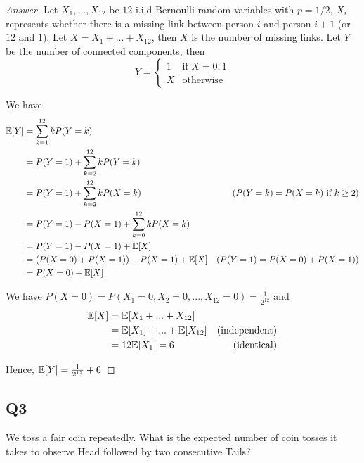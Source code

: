 \documentclass{article}
\begin{document}
\begin{proof}[Answer]

    Let $X_1, ..., X_{12}$ be $12$ i.i.d Bernoulli random variables with $p = 1/2$, $X_i$ represents whether there is a missing link between person $i$ and person $i+1$ (or $12$ and $1$). Let $X = X_1 + ... + X_{12}$, then $X$ is the number of missing links. Let $Y$ be the number of connected components, then
    $$
        Y = \begin{cases}
            1 &\text{if $X=0, 1$} \\
            X &\text{otherwise}
        \end{cases}
    $$

    We have
    \begin{align*}
        \mathbb{E}[Y]
        &= \sum_{k=1}^{12} k P(Y = k) \\ 
        &= P(Y = 1) + \sum_{k=2}^{12} k P(Y=k) \\
        &= P(Y = 1) + \sum_{k=2}^{12} k P(X=k) &\text{($P(Y=k) = P(X=k)$ if $k \geq 2$)}\\
        &= P(Y = 1) - P(X=1) + \sum_{k=0}^{12} k P(X=k)\\
        &= P(Y = 1) - P(X = 1) + \mathbb{E}[X] \\
        &= (P(X = 0) + P(X = 1)) - P(X = 1) + \mathbb{E}[X] &\text{($P(Y = 1) = P(X = 0) + P(X = 1)$)}\\
        &= P(X = 0) + \mathbb{E}[X] \\
    \end{align*}

    We have $P(X=0) = P(X_1=0, X_2=0, ..., X_{12}=0) = \frac{1}{2^{12}}$ and
    \begin{align*}
        \mathbb{E}[X]
        &= \mathbb{E}[X_1 + ... + X_{12}] \\
        &= \mathbb{E}[X_1] + ... + \mathbb{E}[X_{12}] &\text{(independent)} \\
        &= 12 \mathbb{E}[X_1] = 6&\text{(identical)}
    \end{align*}

    Hence, $\mathbb{E}[Y] = \frac{1}{2^{12}} + 6$

\end{proof}

\subsection{Q3}

We toss a fair coin repeatedly. What is the expected number of coin tosses it takes to observe Head followed by two consecutive Tails?
\end{document}
